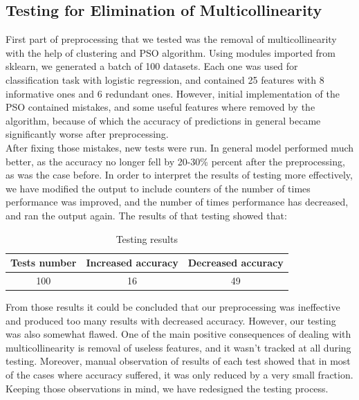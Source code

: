 \documentclass[conference]{IEEEtran}
\begin{document}
\subsection{Testing for Elimination of Multicollinearity}

First part of preprocessing that we tested was the removal of multicollinearity with the help of clustering and PSO algorithm. Using modules imported from sklearn, we generated a batch of 100 datasets. Each one was used for classification task with logistic regression, and contained 25 features with 8 informative ones and 6 redundant ones. However, initial implementation of the PSO contained mistakes, and some useful features where removed by the algorithm, because of which the accuracy of predictions in general became significantly worse after preprocessing.\\

After fixing those mistakes, new tests were run. In general model performed much better, as the accuracy no longer fell by 20-30\% percent after the preprocessing, as was the case before. In order to interpret the results of testing more effectively, we have modified the output to include counters of the number of times performance was improved, and the number of times performance has decreased, and ran the output again. The results of that testing showed that:

\begin{table}[htbp]
	\caption{Testing results}
	\begin{center}
		\begin{tabular}{|c|c|c|}
			\hline
			\textbf{Tests number}&\textbf{Increased accuracy}&\textbf{Decreased accuracy} \\
			\hline
			100&16&49\\
			\hline
		\end{tabular}
		\label{tab1}
	\end{center}
\end{table}

From those results it could be concluded that our preprocessing was ineffective and produced too many results with decreased accuracy. However, our testing was also somewhat flawed. One of the main positive consequences of dealing with multicollinearity is removal of useless features, and it wasn't tracked at all during testing. Moreover, manual observation of results of each test showed that in most of the cases where accuracy suffered, it was only reduced by a very small fraction. Keeping those observations in mind, we have redesigned the testing process.\\
\end{document}
